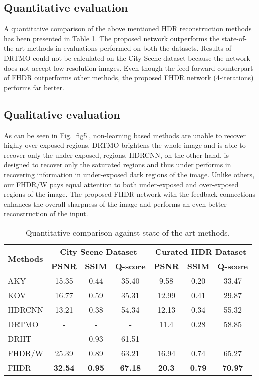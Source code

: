 \documentclass[conference]{IEEEtran}
\begin{document}
\subsection{Quantitative evaluation}
A quantitative comparison of the above mentioned HDR reconstruction methods has been presented in Table 1. The proposed network outperforms the state-of-the-art methods in evaluations performed on both the datasets. Results of DRTMO \cite{endo2017deep} could not be calculated on the City Scene dataset because the network does not accept low resolution images. Even though the feed-forward counterpart of FHDR outperforms other methods, the proposed FHDR network (4-iterations) performs far better.

\subsection{Qualitative evaluation}
As can be seen in Fig. \ref{fig5}, non-learning based methods are unable to recover highly over-exposed regions. DRTMO brightens the whole image and is able to recover only the under-exposed, regions. HDRCNN, on the other hand, is designed to recover only the saturated regions and thus under performs in recovering information in under-exposed dark regions of the image. Unlike others, our FHDR/W pays equal attention to both under-exposed and over-exposed regions of the image. The proposed FHDR network with the feedback connections enhances the overall sharpness of the image and performs an even better reconstruction of the input. 



\begin{table}[htbp]
\centering
\begin{tabular}{|p{1.4cm}|c|c|c|c|c|c|}
\hline
\multirow{2}{*}{\textbf{Methods}} & \multicolumn{3}{|c|}{\textbf{City Scene Dataset}}&\multicolumn{3}{|c|}{\textbf{Curated HDR Dataset}} \\
\cline{2-7} 
& \textbf{PSNR}& \textbf{SSIM}& \textbf{Q-score} & \textbf{PSNR}& \textbf{SSIM}& \textbf{Q-score} \\
\hline
AKY\cite{akyuz2007hdr} & 15.35 & 0.44 & 35.40 & 9.58 & 0.20 & 33.47 \\
\hline
KOV\cite{kovaleski2014high} & 16.77 & 0.59 & 35.31 & 12.99 & 0.41 & 29.87 \\
\hline
HDRCNN\cite{eilertsen2017hdr} & 13.21 & 0.38 & 54.34 & 12.13 & 0.34 & 55.32 \\
\hline
DRTMO\cite{endo2017deep} & - & - & - & 11.4 & 0.28 & 58.85 \\
\hline
DRHT\cite{yang2018image} & - & 0.93 & 61.51 & - & - & - \\
\hline
FHDR/W & 25.39 & 0.89 & 63.21 & 16.94 & 0.74 & 65.27 \\
\hline
FHDR & \textbf{32.54} & \textbf{0.95} & \textbf{67.18} & \textbf{20.3} & \textbf{0.79} & \textbf{70.97} \\
\hline
\end{tabular}
\label{tab1}
\caption{Quantitative comparison against state-of-the-art methods.\\[-4.5ex]}
\end{table}
\end{document}
